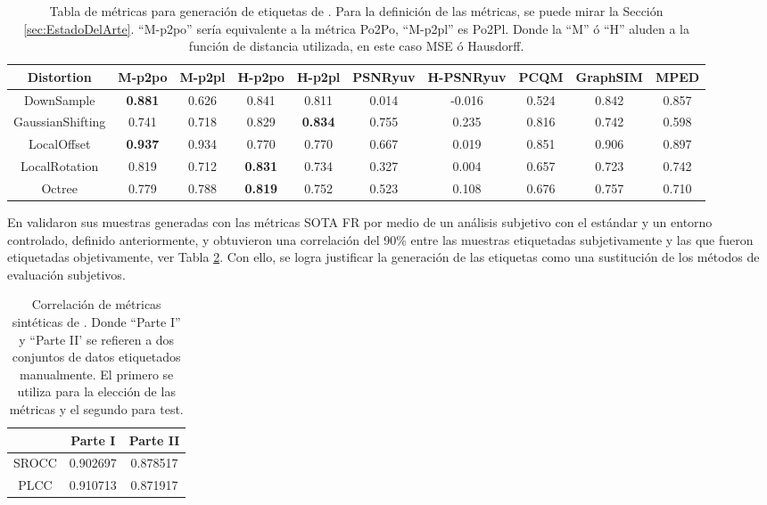\begin{table}[htp]
    \scriptsize
    \hspace{-3cm}
    \begin{tabular}{|c|c|c|c|c|c|c|c|c|c|}
    \hline
        \rowcolor[HTML]{FFC702} 
        \textbf{Distortion} & \textbf{M-p2po} & \textbf{M-p2pl} & \textbf{H-p2po} & \textbf{H-p2pl} & \textbf{PSNRyuv} & \textbf{H-PSNRyuv} & \textbf{PCQM} & \textbf{GraphSIM} & \textbf{MPED} \\ \hline
        DownSample & \textbf{0.881} & 0.626 & 0.841 & 0.811 & 0.014 & -0.016 & 0.524 & 0.842 & 0.857 \\ \hline
        GaussianShifting & 0.741 & 0.718 & 0.829 & \textbf{0.834} & 0.755 & 0.235 & 0.816 & 0.742 & 0.598 \\ \hline
        LocalOffset & \textbf{0.937} & 0.934 & 0.770 & 0.770 & 0.667 & 0.019 & 0.851 & 0.906 & 0.897 \\ \hline
        LocalRotation & 0.819 & 0.712 & \textbf{0.831} & 0.734 & 0.327 & 0.004 & 0.657 & 0.723 & 0.742 \\ \hline
        Octree & 0.779 & 0.788 & \textbf{0.819} & 0.752 & 0.523 & 0.108 & 0.676 & 0.757 & 0.710 \\ \hline
    \end{tabular}
    \caption[Tabla de métricas para generación de etiquetas de \cite{ResSCNN}.]{
    Tabla de métricas para generación de etiquetas de \cite{ResSCNN}.
    Para la definición de las métricas, se puede mirar la Sección \ref{sec:EstadoDelArte}.
    ``M-p2po'' sería equivalente a la métrica Po2Po\cite{PointToPoint}, 
    ``M-p2pl'' es Po2Pl\cite{PointToPlane}. 
    Donde la ``M'' ó ``H'' aluden a la función de distancia utilizada, en este caso MSE ó Hausdorff.
  }
    \label{tab:MetricsPerDistortion}
\end{table}

En \cite{ResSCNN} validaron sus muestras generadas con las métricas SOTA FR 
por medio de un análisis subjetivo con el estándar y 
un entorno controlado, definido anteriormente, y obtuvieron una correlación del 
90\% entre las muestras 
etiquetadas subjetivamente y las que fueron etiquetadas objetivamente, ver Tabla \ref{tab:PseudoCorr}.
Con ello, se logra justificar la generación de las etiquetas como una sustitución 
de los métodos de evaluación subjetivos. 

\begin{table}[H]
  \centering 
  \scriptsize
  \begin{tabular}{|c|c|c|}
    \hline
    \rowcolor[HTML]{FFC702}
     & \textbf{Parte I} & \textbf{Parte II} \\
    \hline 
    SROCC & 0.902697 & 0.878517\\
    \hline
    PLCC & 0.910713 & 0.871917\\
    \hline
  \end{tabular}
  \caption[Correlación de métricas sintéticas de \cite{ResSCNN}.]{
  Correlación de métricas sintéticas de \cite{ResSCNN}.
  Donde ``Parte I'' y ``Parte II' se refieren a dos conjuntos de datos etiquetados 
  manualmente. El primero se utiliza para la elección de las métricas y el segundo 
  para test.
}
  \label{tab:PseudoCorr}
\end{table}

